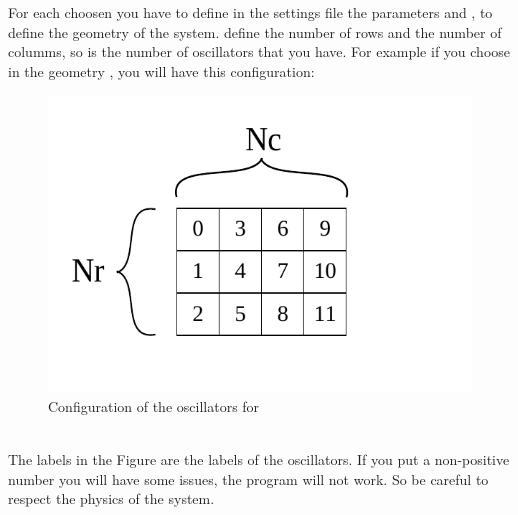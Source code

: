 \documentclass[1pt, a4paper]{article}
\begin{document}
\newpage
\noindent
For each  choosen you have to define in the settings file the parameters  and , to define the geometry of the system.  define the number of rows and  the number of columms, so  is the number of oscillators that you have. For example if you choose  in the geometry , you will have this configuration:\\
\begin{figure}[htbp]
    \centering
    \includegraphics[scale=0.8]{figure/os_table.pdf}
    \caption{Configuration of the oscillators for }
    \label{fig:os_table}
\end{figure}\\
\noindent
The labels in the Figure are the labels of the oscillators. If you put a non-positive number you will have some issues, the program will not work. So be careful to respect the physics of the system.
\end{document}
